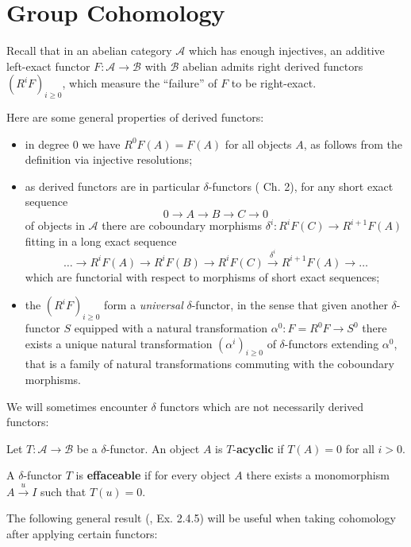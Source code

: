 \documentclass[a4paper, oneside]{memoir}
\begin{document}
\section{Group Cohomology}

Recall that in an abelian category $\mathcal{A}$ which has enough injectives, an additive left-exact functor $F:\mathcal{A}\to\mathcal{B}$ with $\mathcal{B}$ abelian admits right derived functors $(R^i F)_{i\geq 0}$, which measure the ``failure'' of $F$ to be right-exact.

\medskip \noindent Here are some general properties of derived functors:
\begin{itemize}
	\item in degree $0$ we have $R^0F(A)=F(A)$ for all objects $A$, as follows from the definition via injective resolutions;
	\item as derived functors are in particular $\delta$-functors (\cite{Weibel} Ch. 2), for any short exact sequence
	      \[
		      0\to A\to B\to C\to 0
	      \]
	      of objects in $\mathcal{A}$ there are coboundary morphisms $\delta^i:R^iF(C)\to R^{i+1}F(A)$ fitting in a long exact sequence
	      \[
		      \ldots\to R^iF(A)\to R^iF(B)\to R^iF(C)\overset{\delta^i}{\to} R^{i+1}F(A)\to\ldots
	      \]
	      which are functorial with respect to morphisms of short exact sequences;
	\item the $(R^i F)_{i \geq 0}$ form a \textit{universal} $\delta$-functor, in the sense that given another $\delta$-functor $S$ equipped with a natural transformation $\alpha^0:F=R^0F\to S^0$ there exists a unique natural transformation $(\alpha^i)_{i\geq 0}$ of $\delta$-functors extending $\alpha^0$, that is a family of natural transformations commuting with the coboundary morphisms.
\end{itemize}

We will sometimes encounter $\delta$ functors which are not necessarily derived functors:
\begin{definition}
	Let $T:\mathcal{A}\to\mathcal{B}$ be a $\delta$-functor. An object $A$ is $T$-\textbf{acyclic} if $T(A)=0$ for all $i>0$.
\end{definition}

\begin{definition}
	A $\delta$-functor $T$ is \textbf{effaceable} if for every object $A$ there exists a monomorphism $A\overset{u}{\to} I$ such that $T(u)=0$.
\end{definition}

The following general result (\cite{Tohoku}, Ex. 2.4.5) will be useful when taking cohomology after applying certain functors:
\end{document}
